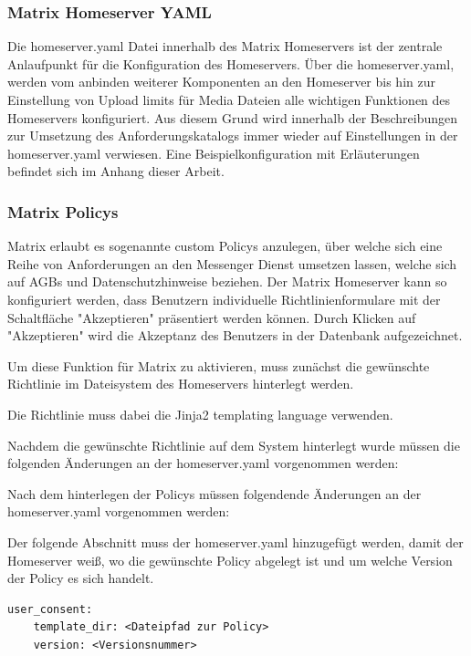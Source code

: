 \subsubsection{Matrix Homeserver YAML}\label{chapter:vdmf}
Die homeserver.yaml Datei innerhalb des Matrix Homeservers ist der zentrale Anlaufpunkt für die Konfiguration des Homeservers.
Über die homeserver.yaml, werden vom anbinden weiterer Komponenten an den Homeserver bis hin zur Einstellung von Upload limits für Media Dateien alle wichtigen Funktionen des Homeservers konfiguriert. Aus diesem Grund wird innerhalb der Beschreibungen zur Umsetzung des Anforderungskatalogs immer wieder auf Einstellungen in der homeserver.yaml verwiesen. Eine Beispielkonfiguration mit Erläuterungen befindet sich im Anhang dieser Arbeit.

\subsubsection{Matrix Policys}\label{chapter:vdmf}
Matrix erlaubt es sogenannte custom Policys anzulegen, über welche sich eine Reihe von Anforderungen an den Messenger Dienst umsetzen lassen, welche sich auf AGBs und Datenschutzhinweise beziehen.
Der Matrix Homeserver kann so konfiguriert werden, dass Benutzern individuelle Richtlinienformulare mit der Schaltfläche "Akzeptieren" präsentiert werden können. Durch Klicken auf "Akzeptieren" wird die Akzeptanz des Benutzers in der Datenbank aufgezeichnet.

Um diese Funktion für Matrix zu aktivieren, muss zunächst die gewünschte Richtlinie im Dateisystem des Homeservers hinterlegt werden.

Die Richtlinie muss dabei die Jinja2 templating language verwenden.

Nachdem die gewünschte Richtlinie auf dem System hinterlegt wurde müssen die folgenden Änderungen an der homeserver.yaml vorgenommen werden:

Nach dem hinterlegen der Policys müssen folgendende Änderungen an der homeserver.yaml vorgenommen werden:

Der folgende Abschnitt muss der homeserver.yaml hinzugefügt werden, damit der Homeserver weiß, wo die gewünschte Policy abgelegt ist und um welche Version der Policy es sich handelt.

\begin{lstlisting}
user_consent:
    template_dir: <Dateipfad zur Policy>
    version: <Versionsnummer>
\end{lstlisting}

